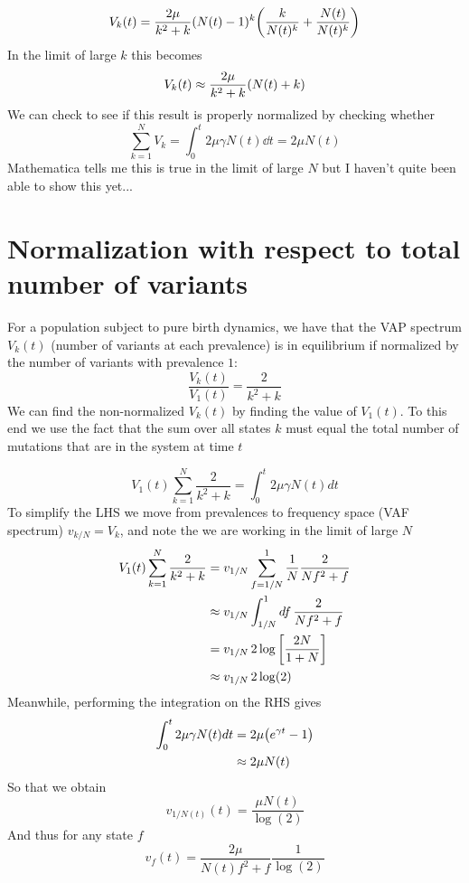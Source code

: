 \documentclass[pdftex,12pt,a4paper]{scrartcl}
\begin{document}
\begin{equation}
    V_k(t) = \frac{2\mu}{k^2 + k} (N(t)-1)^k \qty( \frac{k}{N(t)^k} + \frac{N(t)}{N(t)^k} )
\end{equation}
In the limit of large $k$ this becomes
\begin{equation}
    V_k(t) \approx \frac{2\mu}{k^2+k} \qty(N(t)+k)
\end{equation}
We can check to see if this result is properly normalized by checking whether
\begin{equation}
    \sum_{k=1}^N V_k = \int_0^t 2\mu \gamma N(t) \dd{t} = 2\mu N(t)
\end{equation}
Mathematica tells me this is true in the limit of large $N$ but I haven't quite been able to show this yet...

\section{Normalization with respect to total number of variants}

For a population subject to pure birth dynamics, we have that the VAP spectrum $V_k(t)$ (number of variants at each prevalence) is in equilibrium if normalized by the number of variants with prevalence $1$:
\begin{equation}
    \frac{V_k(t)}{V_1(t)} = \frac{2}{k^2+k}
\end{equation}
We can find the non-normalized $V_k(t)$ by finding the value of $V_1(t)$. To this end we use the fact that the sum over all states $k$ must equal the total number of mutations that are in the system at time $t$

\begin{equation}
    V_1(t) \sum_{k=1}^N \frac{2}{k^2+k} = \int_0^t 2 \mu \gamma N(t) dt
\end{equation}
To simplify the LHS we move from prevalences to frequency space (VAF spectrum) $v_{k/N} = V_{k}$, and note the we are working in the limit of large $N$
\begin{align}
    V_1(t) \sum_{k=1}^N \frac{2}{k^2+k} &= v_{1/N} \sum_{f=1/N}^{1} \frac{1}{N} \frac{2}{Nf^2 + f} \\
    &\approx v_{1/N} \int_{1/N   }^1 df \, \frac{2}{Nf^2 + f} \\
    &= v_{1/N} \, 2 \log \qty[ \frac{2N}{1+N} ] \\
    &\approx v_{1/N} \, 2 \log(2)
\end{align}
Meanwhile, performing the integration on the RHS gives
\begin{align}
    \int_0^t 2 \mu \gamma N(t) dt &= 2\mu \qty(e^{\gamma t} - 1) \\
    &\approx 2\mu N(t)
\end{align}
So that we obtain
\begin{equation}
    v_{1/N(t)}(t) = \frac{\mu N(t)}{\log (2)}
\end{equation}
And thus for any state $f$
\begin{equation}
    v_f(t) = \frac{2\mu}{N(t) f^2 + f} \frac{1}{\log (2)}
\end{equation}
\end{document}
